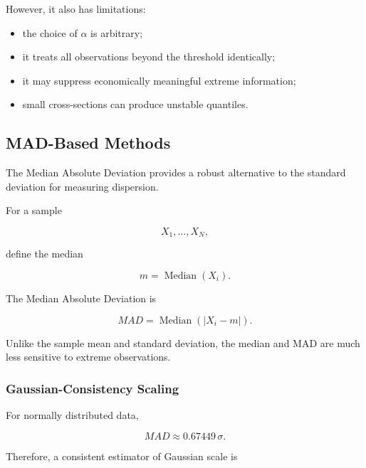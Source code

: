 \documentclass[11pt,a4paper]{article}
\begin{document}
However, it also has limitations:

\begin{itemize}
    \item the choice of $\alpha$ is arbitrary;
    \item it treats all observations beyond the threshold identically;
    \item it may suppress economically meaningful extreme information;
    \item small cross-sections can produce unstable quantiles.
\end{itemize}


\subsection{MAD-Based Methods}
\label{subsec:mad_methods}

The Median Absolute Deviation provides a robust alternative to the standard
deviation for measuring dispersion.

For a sample

\begin{equation}
X_1,\ldots,X_N,
\end{equation}

define the median

\begin{equation}
m
=
\operatorname{Median}(X_i).
\end{equation}

The Median Absolute Deviation is

\begin{equation}
\boxed{
MAD
=
\operatorname{Median}
\left(
|X_i-m|
\right).
}
\end{equation}

Unlike the sample mean and standard deviation, the median and MAD are much less
sensitive to extreme observations.


\subsubsection{Gaussian-Consistency Scaling}

For normally distributed data,

\begin{equation}
MAD
\approx
0.67449\,\sigma.
\end{equation}

Therefore, a consistent estimator of Gaussian scale is
\end{document}
